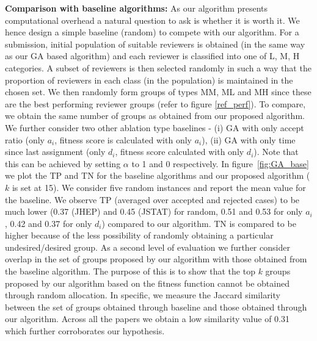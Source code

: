{\bf Comparison with baseline algorithms:}
As our algorithm presents computational overhead a natural question to ask is whether it is worth it. We hence design a simple 
baseline (random) to compete with our algorithm. For a submission, initial population of suitable reviewers is obtained (in the same way as our GA based algorithm) and each reviewer is classified into one of L, M, H categories. A subset of reviewers is then selected randomly in such a way that the proportion of reviewers in each class (in the population) is maintained 
in the chosen set. 
We then randomly form groups of types MM, ML and MH since these are the best performing reviewer groups (refer to figure \ref{ref_perf}).  
To compare, we obtain the same number of groups as obtained from our proposed algorithm. 
We further consider two other 
ablation type baselines - (i) GA with only accept ratio (only $a_i$, fitness score is calculated with only $a_i$), (ii) GA with only time since last assignment 
(only $d_i$, fitness score calculated with only $d_i$). Note that this can be achieved by setting $\alpha$ to 1 and 0 respectively. 
In figure~\ref{fig:GA_base} we plot the TP and TN for 
the baseline algorithms and our proposed algorithm ($k$ is set at 15). 
We consider five random instances and report the mean value for the baseline. We observe TP (averaged over accepted and rejected cases) 
to be much lower (0.37 (JHEP) and 0.45 (JSTAT) for random, 0.51 and 0.53 for only $a_i$, 0.42 and 0.37 for only $d_i$) compared to our algorithm. 
 TN is compared to be higher because of the less possibility of randomly obtaining a particular undesired/desired group.  
As a second level of evaluation we further consider overlap in the set of groups proposed by our 
algorithm with those obtained from the baseline algorithm. The purpose of this is to show that the top $k$ groups proposed by our algorithm based on the fitness function cannot be obtained 
through random allocation. In specific, we measure the Jaccard similarity between the set of groups obtained through baseline and those obtained through our algorithm. Across 
all the papers we obtain a low similarity value of 0.31 which further corroborates our hypothesis.\\

